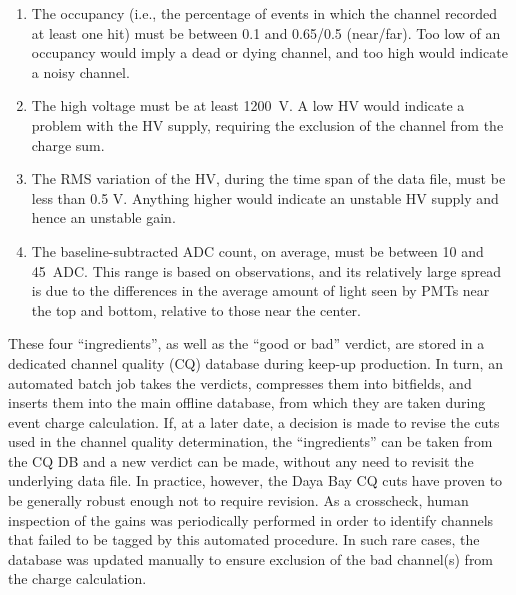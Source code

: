 \documentclass[../thesis.tex]{subfiles}
\begin{document}
\begin{enumerate}
\item The occupancy (i.e., the percentage of events in which the channel recorded at least one hit) must be between 0.1 and 0.65/0.5 (near/far). Too low of an occupancy would imply a dead or dying channel, and too high would indicate a noisy channel.
\item The high voltage must be at least 1200~V. A low HV would indicate a problem with the HV supply, requiring the exclusion of the channel from the charge sum.
\item The RMS variation of the HV, during the time span of the data file, must be less than 0.5 V. Anything higher would indicate an unstable HV supply and hence an unstable gain.
\item The baseline-subtracted ADC count, on average, must be between 10 and 45~ADC. This range is based on observations, and its relatively large spread is due to the differences in the average amount of light seen by PMTs near the top and bottom, relative to those near the center.
\end{enumerate}

These four ``ingredients'', as well as the ``good or bad'' verdict, are stored in a dedicated channel quality (CQ) database during keep-up production. In turn, an automated batch job takes the verdicts, compresses them into bitfields, and inserts them into the main offline database, from which they are taken during event charge calculation. If, at a later date, a decision is made to revise the cuts used in the channel quality determination, the ``ingredients'' can be taken from the CQ DB and a new verdict can be made, without any need to revisit the underlying data file. In practice, however, the Daya Bay CQ cuts have proven to be generally robust enough not to require revision. As a crosscheck, human inspection of the gains was periodically performed in order to identify channels that failed to be tagged by this automated procedure. In such rare cases, the database was updated manually to ensure exclusion of the bad channel(s) from the charge calculation.

\subfilebackmatter
\end{document}
